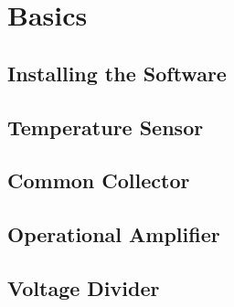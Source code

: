 \section{Basics}

\subsection{Installing the Software}
\subsection{Temperature Sensor}
\subsection{Common Collector}
\subsection{Operational Amplifier}
\subsection{Voltage Divider}









